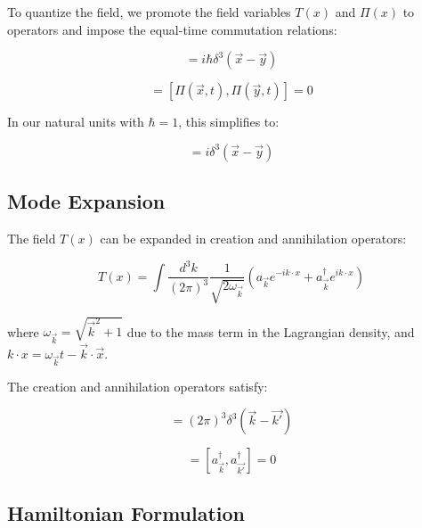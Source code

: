 \documentclass[12pt,a4paper]{article}
\newcommand{\Tfield}{T(x)}
\newcommand{\vecx}{\vec{x}}
\begin{document}
	To quantize the field, we promote the field variables $\Tfield$ and $\Pi(x)$ to operators and impose the equal-time commutation relations:
	
	\begin{equation}
		[\Tfield(\vecx, t), \Pi(\vec{y}, t)] = i\hbar\delta^3(\vecx - \vec{y})
	\end{equation}
	
	\begin{equation}
		[\Tfield(\vecx, t), \Tfield(\vec{y}, t)] = [\Pi(\vecx, t), \Pi(\vec{y}, t)] = 0
	\end{equation}
	
	In our natural units with $\hbar = 1$, this simplifies to:
	
	\begin{equation}
		[\Tfield(\vecx, t), \Pi(\vec{y}, t)] = i\delta^3(\vecx - \vec{y})
	\end{equation}
	
	\subsection{Mode Expansion}
	\label{sec:modenentwicklung}
	
	The field $\Tfield$ can be expanded in creation and annihilation operators:
	
	\begin{equation}
		\Tfield = \int \frac{d^3k}{(2\pi)^3} \frac{1}{\sqrt{2\omega_{\vec{k}}}} \left(a_{\vec{k}} e^{-ik \cdot x} + a_{\vec{k}}^{\dagger} e^{ik \cdot x}\right)
	\end{equation}
	
	where $\omega_{\vec{k}} = \sqrt{\vec{k}^2 + 1}$ due to the mass term in the Lagrangian density, and $k \cdot x = \omega_{\vec{k}}t - \vec{k} \cdot \vecx$.
	
	The creation and annihilation operators satisfy:
	
	\begin{equation}
		[a_{\vec{k}}, a_{\vec{k'}}^{\dagger}] = (2\pi)^3 \delta^3(\vec{k} - \vec{k'})
	\end{equation}
	
	\begin{equation}
		[a_{\vec{k}}, a_{\vec{k'}}] = [a_{\vec{k}}^{\dagger}, a_{\vec{k'}}^{\dagger}] = 0
	\end{equation}
	
	\subsection{Hamiltonian Formulation}
	\label{sec:hamilton}
	
\end{document}
